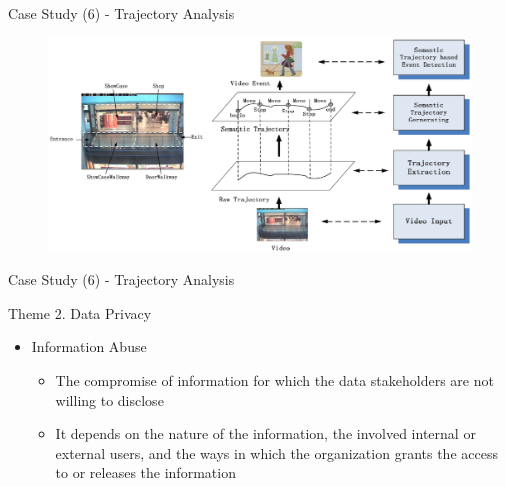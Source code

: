 \documentclass[
 size=14pt,
 paper=smartboard,  %
 mode=present, 		%
 display=slides, 	%
 style=tuliplab,  	%
 pauseslide,
 fleqn,leqno]{powerdot}{}
\begin{document}
\begin{slide}[toc=,bm=]{Case Study (6) - Trajectory Analysis}
\begin{figure}[htbp]
  \includegraphics[width=1.0\textwidth]{figures//theme1//dsa_3.eps}
\end{figure}


\footnotesize{}
\end{slide}



\begin{slide}[toc=,bm=]{Case Study (6) - Trajectory Analysis}
\begin{figure}[ht]
\end{figure}
\end{slide}


\begin{slide}{Theme 2. Data Privacy}
\begin{itemize}
\item
Information Abuse

\begin{itemize}
\item
The compromise of information
for which the data stakeholders are not willing to disclose

\item
It depends on the nature of the information,
the involved internal or external users,
and the ways in which the organization grants the access to
or releases the information
\end{itemize}
\end{itemize}

\end{slide}
\end{document}
